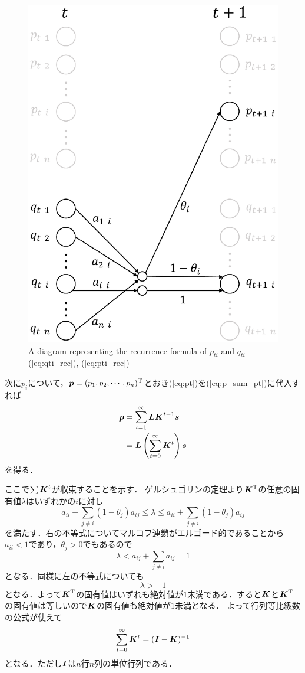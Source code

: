 \begin{figure}[bt]
    \centering
    \includegraphics[keepaspectratio, width=0.7\linewidth]{figs/pq.eps}
    \caption{A diagram representing the recurrence formula of $ p_{t i} $ and $ q_{t i} $ (\ref{eq:qti_rec}), (\ref{eq:pti_rec})}
\end{figure}

次に$ p_i $について，$ \boldsymbol{p} = (p_1 , p_2 , \cdots , p_n)^\mathrm{T} $とおき(\ref{eq:pt})を(\ref{eq:p_sum_pt})に代入すれば
\begin{align}
    \boldsymbol{p} &= \sum_{t=1}^{\infty} \boldsymbol{L} \boldsymbol{K}^{t - 1} \boldsymbol{s} \nonumber \\
    &= \boldsymbol{L} \left( \sum_{t=0}^{\infty} \boldsymbol{K}^t \right) \boldsymbol{s} \label{eq:p_}
\end{align}
を得る．

ここで$ \sum \boldsymbol{K}^t $が収束することを示す．
ゲルシュゴリンの定理\cite{s_saito}より$ \boldsymbol{K}^\mathrm{T} $の任意の固有値$ \lambda $はいずれかの$ i $に対し
\begin{equation*}
    a_{i i} - \sum_{j \ne i}(1 - \theta_j) a_{i j} \le \lambda \le a_{i i} + \sum_{j \ne i}(1 - \theta_j) a_{i j}
\end{equation*}
を満たす．右の不等式についてマルコフ連鎖がエルゴード的であることから$ a_{i i} < 1 $\cite{funaki}であり，$ \theta_j > 0 $でもあるので
\begin{equation*}
    \lambda < a_{i j} + \sum_{j \ne i} a_{i j} = 1
\end{equation*}
となる．同様に左の不等式についても
\begin{equation*}
    \lambda > -1
\end{equation*}
となる．よって$ \boldsymbol{K}^\mathrm{T} $の固有値はいずれも絶対値が$ 1 $未満である．すると$ \boldsymbol{K} $と$ \boldsymbol{K}^\mathrm{T} $の固有値は等しいので$ \boldsymbol{K} $の固有値も絶対値が$ 1 $未満となる．
よって行列等比級数の公式\cite{m_saito}が使えて
\begin{equation} \label{eq:sumK}
    \sum_{t=0}^{\infty} \boldsymbol{K}^t = (\boldsymbol{I} - \boldsymbol{K})^{-1}
\end{equation}
となる．ただし$ \boldsymbol{I} $は$ n $行$ n $列の単位行列である．

